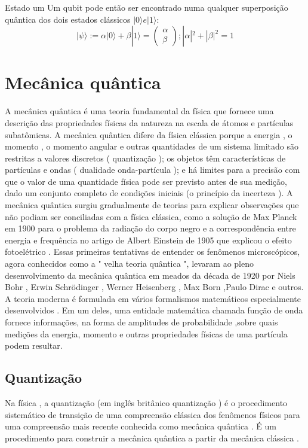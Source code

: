 \documentclass{report}
\begin{document}
\newline Estado um
\newline\newline Um qubit pode então ser encontrado numa qualquer superposição quântica dos dois estados clássicos 
\(|0\rangle e |1\rangle:\)
\newline
\begin{equation}
        |\psi\rangle := \alpha |0\rangle + \beta |1\rangle =\begin{pmatrix}
    \alpha \\ \beta 
\end{pmatrix};|\alpha|^2+|\beta|^2 = 1
\end{equation}
\section{Mecânica quântica}
A mecânica quântica é uma teoria fundamental da física que fornece uma descrição das propriedades físicas da natureza na escala de átomos e partículas subatômicas.
\newline
A mecânica quântica difere da física clássica porque a energia , o momento , o momento angular e outras quantidades de um sistema limitado são restritas a valores discretos ( quantização ); os objetos têm características de partículas e ondas ( dualidade onda-partícula ); e há limites para a precisão com que o valor de uma quantidade física pode ser previsto antes de sua medição, dado um conjunto completo de condições iniciais (o princípio da incerteza ).
A mecânica quântica surgiu gradualmente de teorias para explicar observações que não podiam ser conciliadas com a física clássica, como a solução de Max Planck em 1900 para o problema da radiação do corpo negro e a correspondência entre energia e frequência no artigo de Albert Einstein de 1905 que explicou o efeito fotoelétrico . Essas primeiras tentativas de entender os fenômenos microscópicos, agora conhecidos como a " velha teoria quântica ", levaram ao pleno desenvolvimento da mecânica quântica em meados da década de 1920 por Niels Bohr , Erwin Schrödinger , Werner Heisenberg , Max Born ,Paulo Dirac e outros. A teoria moderna é formulada em vários formalismos matemáticos especialmente desenvolvidos . Em um deles, uma entidade matemática chamada função de onda fornece informações, na forma de amplitudes de probabilidade ,sobre quais medições da energia, momento e outras propriedades físicas de uma partícula podem resultar.
\subsection{Quantização}
Na física , a quantização (em inglês britânico quantização ) é o procedimento sistemático de transição de uma compreensão clássica dos fenômenos físicos para uma compreensão mais recente conhecida como mecânica quântica . É um procedimento para construir a mecânica quântica a partir da mecânica clássica .
\end{document}
